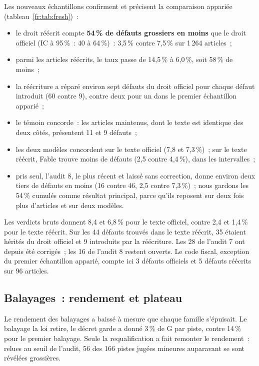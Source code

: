 \documentclass[11pt,a4paper]{article}
\begin{document}
Les nouveaux échantillons confirment et précisent la comparaison appariée (tableau~\ref{fr:tab:fresh})~:
\begin{itemize}
  \item le droit réécrit compte \textbf{54\,\% de défauts grossiers en moins} que le droit officiel (IC à 95\,\%~: 40 à 64\,\%)~: 3,5\,\% contre 7,5\,\% sur 1\,264 articles~;
  \item parmi les articles réécrits, le taux passe de 14,5\,\% à 6,0\,\%, soit 58\,\% de moins~;
  \item la réécriture a réparé environ sept défauts du droit officiel pour chaque défaut introduit (60 contre 9), contre deux pour un dans le premier échantillon apparié~;
  \item le témoin concorde~: les articles maintenus, dont le texte est identique des deux côtés, présentent 11 et 9 défauts~;
  \item les deux modèles concordent sur le texte officiel (7,8 et 7,3\,\%)~; sur le texte réécrit, Fable trouve moins de défauts (2,5 contre 4,4\,\%), dans les intervalles~;
  \item pris seul, l'audit 8, le plus récent et laissé sans correction, donne environ deux tiers de défauts en moins (16 contre 46, 2,5 contre 7,3\,\%)~; nous gardons les 54\,\% cumulés comme résultat principal, parce qu'ils reposent sur deux fois plus d'articles et sur deux modèles.
\end{itemize}
Les verdicts bruts donnent 8,4 et 6,8\,\% pour le texte officiel, contre 2,4 et 1,4\,\% pour le texte réécrit. Sur les 44 défauts trouvés dans le texte réécrit, 35 étaient hérités du droit officiel et 9 introduits par la réécriture. Les 28 de l'audit 7 ont depuis été corrigés~; les 16 de l'audit 8 restent ouverts. Le code fiscal, exception du premier échantillon apparié, compte ici 3 défauts officiels et 5 défauts réécrits sur 96 articles.

\subsection{Balayages~: rendement et plateau}

Le rendement des balayages a baissé à mesure que chaque famille s'épuisait. Le balayage \og la loi retire, le décret garde \fg{} a donné 3\,\% de G par piste, contre 14\,\% pour le premier balayage. Seule la requalification a fait remonter le rendement~: relues au seuil de l'audit, 56 des 166 pistes jugées mineures auparavant se sont révélées grossières.
\end{document}
